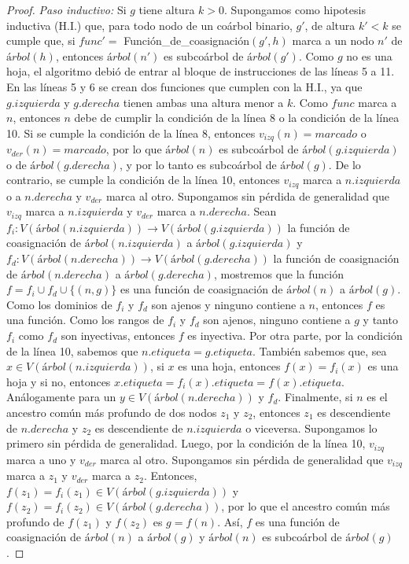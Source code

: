 \begin{proof}
    \emph{Paso inductivo:} Si $g$ tiene altura $k > 0$. Supongamos como hipotesis inductiva (H.I.) que, para todo nodo de un coárbol binario, $g'$, de altura $k' < k$ se cumple que, si $func' = $ Función\_de\_coasignación$(g',h)$ marca a un nodo $n'$ de $árbol(h)$, entonces $árbol(n')$ es subcoárbol de $árbol(g')$. Como $g$ no es una hoja, el algoritmo debió de entrar al bloque de instrucciones de las líneas 5 a 11. En las líneas 5 y 6 se crean dos funciones que cumplen con la H.I., ya que $g.izquierda$ y $g.derecha$ tienen ambas una altura menor a $k$. Como $func$ marca a $n$, entonces $n$ debe de cumplir la condición de la línea 8 o la condición de la línea 10. Si se cumple la condición de la línea 8, entonces $v_{izq}(n) = marcado$ o $v_{der}(n) = marcado$, por lo que $árbol(n)$ es subcoárbol de $árbol(g.izquierda)$ o de $árbol(g.derecha)$, y por lo tanto es subcoárbol de $árbol(g)$. De lo contrario, se cumple la condición de la línea 10, entonces $v_{izq}$ marca a $n.izquierda$ o a $n.derecha$ y $v_{der}$ marca al otro. Supongamos sin pérdida de generalidad que $v_{izq}$ marca a $n.izquierda$ y $v_{der}$ marca a $n.derecha$. Sean $f_i:V(árbol(n.izquierda))\rightarrow V(árbol(g.izquierda))$ la función de coasignación de $árbol(n.izquierda)$ a $árbol(g.izquierda)$ y $f_d:V(árbol(n.derecha))\rightarrow V(árbol(g.derecha))$ la función de coasignación de $árbol(n.derecha)$ a $árbol(g.derecha)$, mostremos que la función $f = f_i \cup f_d \cup \{(n,g)\}$ es una función de coasignación de $árbol(n)$ a $árbol(g)$. Como los dominios de $f_i$ y $f_d$ son ajenos y ninguno contiene a $n$, entonces $f$ es una función. Como los rangos de $f_i$ y $f_d$ son ajenos, ninguno contiene a $g$ y tanto $f_i$ como $f_d$ son inyectivas, entonces $f$ es inyectiva. Por otra parte, por la condición de la línea 10, sabemos que $n.etiqueta = g.etiqueta$. También sabemos que, sea $x \in V(árbol(n.izquierda))$, si $x$ es una hoja, entonces $f(x) = f_i(x)$ es una hoja y si no, entonces $x.etiqueta = f_i(x).etiqueta = f(x).etiqueta$. Análogamente para un $y \in V(árbol(n.derecha))$ y $f_d$. Finalmente, si $n$ es el ancestro común más profundo de dos nodos $z_1$ y $z_2$, entonces $z_1$ es descendiente de $n.derecha$ y $z_2$ es descendiente de $n.izquierda$ o viceversa. Supongamos lo primero sin pérdida de generalidad. Luego, por la condición de la línea 10, $v_{izq}$ marca a uno y $v_{der}$ marca al otro. Supongamos sin pérdida de generalidad que $v_{izq}$ marca a $z_1$ y $v_{der}$ marca a $z_2$. Entonces, $f(z_1) = f_i(z_1) \in V(árbol(g.izquierda))$ y $f(z_2) = f_i(z_2) \in V(árbol(g.derecha))$, por lo que el ancestro común más profundo de $f(z_1)$ y $f(z_2)$ es $g = f(n)$. Así, $f$ es una función de coasignación de $árbol(n)$ a $árbol(g)$ y $árbol(n)$ es subcoárbol de $árbol(g)$.
    

\end{proof}
